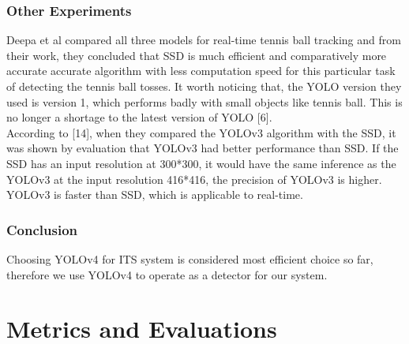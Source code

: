         \subsubsection{Other Experiments}
            Deepa et al compared all three models for real-time tennis ball tracking and from their work, they concluded that SSD is much efficient and comparatively more accurate accurate algorithm with less computation speed for this particular task of detecting the tennis ball tosses. It worth noticing that, the YOLO version they used is version 1, which performs badly with small objects like tennis ball. This is no longer a shortage to the latest version of YOLO [6]. \\ 
            \vspace{3mm}
            According to [14], when they compared the YOLOv3 algorithm with the SSD, it was shown by evaluation that YOLOv3 had better performance than SSD. If the SSD has an input resolution at 300*300, it would have the same inference as the YOLOv3 at the input resolution 416*416, the precision of YOLOv3 is higher. YOLOv3 is faster than SSD, which is applicable to real-time. \\ 
        
        \subsubsection{Conclusion}
            Choosing YOLOv4 for ITS system is considered most efficient choice so far, therefore we use YOLOv4 to operate as a detector for our system.
\section{Metrics and Evaluations}

